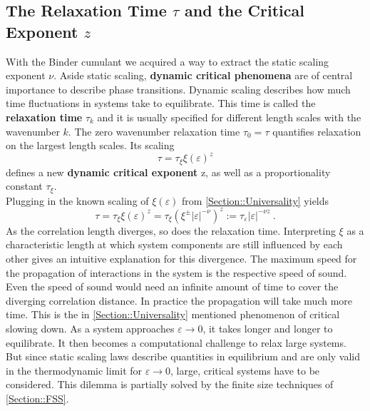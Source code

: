 	\subsection{The Relaxation Time $\tau$ and the Critical Exponent $z$}
	With the Binder cumulant we acquired a way to extract the static scaling exponent $\nu$. Aside static scaling, \textbf{dynamic critical phenomena} are of central importance to describe phase transitions. Dynamic scaling describes how much time fluctuations in systems take to equilibrate. This time is called the  \textbf{relaxation time} $\tau_k$ and it is usually specified for different length scales with the wavenumber $k$. The zero wavenumber relaxation time $\tau_0 =	\tau$ quantifies relaxation on the largest length scales. Its scaling \cite{hohenberg1977theory}
	\begin{equation}
		\tau =	\tau_\xi \xi(\varepsilon)^z
	\end{equation}
	defines a new \textbf{dynamic critical exponent} z, as well as a proportionality constant $\tau_\xi$. \\
	
	Plugging in the known scaling of $\xi(\varepsilon)$ from \autoref{Section::Universality} yields
	\begin{equation}
		\tau = \tau_\xi \xi(\varepsilon)^z =\tau_\xi	\left(\xi^{\pm} |\varepsilon|^{-\nu}\right)^z :=	\tau_\varepsilon |\varepsilon|^{-\nu z} ~.
	\end{equation}
	As the correlation length diverges, so does the relaxation time. Interpreting $\xi$ as a characteristic length at which system components are still influenced by each other gives an intuitive explanation for this divergence. The maximum speed for the propagation of interactions in the system is the respective speed of sound. Even the speed of sound would need an infinite amount of time to cover the diverging correlation distance. In practice the propagation will take much more time. This is the in \autoref{Section::Universality} mentioned phenomenon of critical slowing down. As a system approaches $\varepsilon \rightarrow 0$, it takes longer and longer to equilibrate. It then becomes a computational challenge to relax large systems. But since static scaling laws describe quantities in equilibrium and are only valid in the thermodynamic limit for $\varepsilon \rightarrow 0$, large, critical systems have to be considered.  This dilemma is partially solved by the finite size techniques of \autoref{Section::FSS}. \\
	

